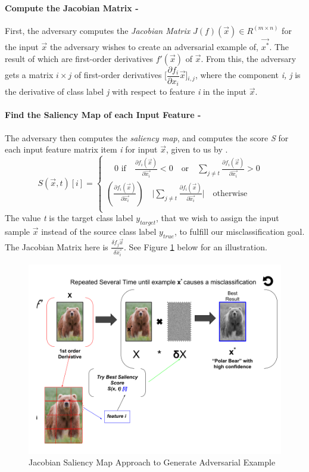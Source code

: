 \documentclass[grad,lot,lof,11pt,oneside,onehalfspace]{RUthesis}
\begin{document}
\paragraph{Compute the Jacobian Matrix -} First, the adversary computes the \textit{Jacobian Matrix} \textit{$J(f)(\vec{x})\in R^{(m\times n)}$} for the input $\vec{x}$ the adversary wishes to create an adversarial example of, $\vec{x^{*}}$. The result of which are first-order derivatives \textit{$f'(\vec{x})$} of $\vec{x}$. From this, the adversary gets a matrix \textit{$i\times j$} of first-order derivatives [$\dfrac{\partial f_{i}}{\partial x_{i}}\vec{x}$]$_{i,j}$, where the component \textit{i, j} is the derivative of class label \textit{j} with respect to feature \textit{i} in the input \textit{$\vec{x}$}.
\paragraph{Find the Saliency Map of each Input Feature -}
The adversary then computes the \textit{saliency map}, and computes the score \textit{S} for each input feature  matrix item \textit{i} for input  \textit{$\vec{x}$}, given to us by \cite{papernot_cleverhans_2016}.
\begin{equation}
S(\vec{x}, t)[i] =
\begin{cases} 
\quad \textrm{0 if} \quad \frac{\partial f_{i}(\vec{x})}{\partial\vec{x_{i}}} < 0 \quad \textrm{or} \quad \sum_{j\neq t} \frac{\partial f_{i}(\vec{x})}{\partial\vec{x_{i}}} > \textrm{0} \quad\\
(\frac{\partial f_{i}(\vec{x})}{\partial\vec{x_{i}}}) \quad \lvert\sum_{j\neq t} \frac{\partial f_{i}(\vec{x})}{\partial\vec{x_{i}}}\rvert \quad \textrm{otherwise} \quad\\
\end{cases}
\end{equation}
The value \textit{t} is the target class label \textit{$y_{target}$}, that we wish to assign the input sample $\vec{x}$ instead of the source class label \textit{$y_{true}$}, to fulfill our misclassification goal. The Jacobian Matrix here is \textit{$\frac{\delta f_{j}\vec{x}}{\delta \vec{x_{i}}}$}. See Figure \ref*{fig:Flippingthelabel} below for an illustration. 
\begin{figure}[h]
\centering
\includegraphics[width=0.7\linewidth]{"Images/Chapter 4/Flippingthelabel"}
\caption{Jacobian Saliency Map Approach to Generate Adversarial Example}
\label{fig:Flippingthelabel}
\end{figure}
\end{document}
